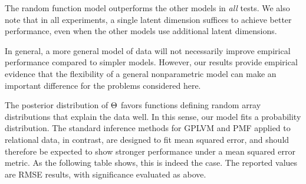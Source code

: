 
The random function model outperforms the other models in \emph{all} tests.
We also note that in all experiments, a single latent dimension suffices to achieve better performance, even when the other models use additional latent dimensions.

In general, a more general model of data will not necessarily improve empirical performance compared to simpler models.
However, our results provide empirical evidence that the flexibility of a general nonparametric model can make an important difference for the problems considered here.

The posterior distribution of $\Theta$ favors functions defining random array distributions that explain the data well.
In this sense, our model fits a probability distribution.
The standard inference methods for GPLVM and PMF applied to relational data, in contrast, are designed to fit mean squared error, and should therefore be expected to show stronger performance under a mean squared error metric.
As the following table shows, this is indeed the case.
The reported values are RMSE results, with significance evaluated as above.

